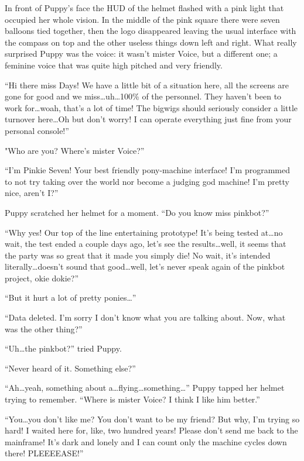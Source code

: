 In front of Puppy's face the HUD of the helmet flashed with a pink light that occupied her whole vision. In the middle of the pink square there were seven balloons tied together, then the logo disappeared leaving the usual interface with the compass on top and the other useless things down left and right. What really surprised Puppy was the voice: it wasn't mister Voice, but a different one; a feminine voice that was quite high pitched and very friendly.

``Hi there miss Days! We have a little bit of a situation here, all the screens are gone for good and we miss\dots uh\dots 100\% of the personnel. They haven't been to work for\dots woah, that's a lot of time! The bigwigs should seriously consider a little turnover here\dots Oh but don't worry! I can operate everything just fine from your personal console!''

"Who are you? Where's mister Voice?''

``I'm Pinkie Seven! Your best friendly pony-machine interface! I'm programmed to not try taking over the world nor become a judging god machine! I'm pretty nice, aren't I?''

Puppy scratched her helmet for a moment. ``Do you know miss pinkbot?''

``Why yes! Our top of the line entertaining prototype! It's being tested at\dots no wait, the test ended a couple days ago, let's see the results\dots well, it seems that the party was so great that it made you simply die! No wait, it's intended literally\dots doesn't sound that good\dots well, let's never speak again of the pinkbot project, okie dokie?''

``But it hurt a lot of pretty ponies\dots''

``Data deleted. I'm sorry I don't know what you are talking about. Now, what was the other thing?''

``Uh\dots the pinkbot?'' tried Puppy.

``Never heard of it. Something else?''

``Ah\dots yeah, something about a\dots flying\dots something\dots'' Puppy tapped her helmet trying to remember. ``Where is mister Voice? I think I like him better.''

``You\dots you don't like me? You don't want to be my friend? But why, I'm trying so hard! I waited here for, like, two hundred years! Please don't send me back to the mainframe! It's dark and lonely and I can count only the machine cycles down there! PLEEEEASE!''

